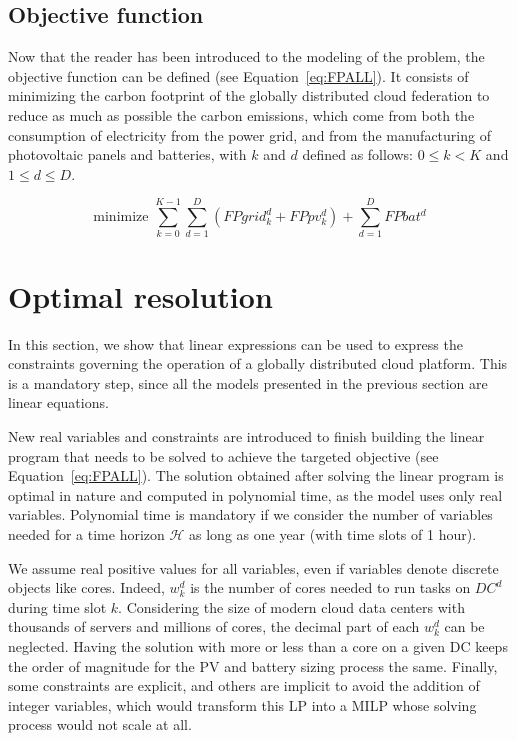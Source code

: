\subsection{Objective function}
\label{sec:objectivefunction_ccgrid}

Now that the reader has been introduced to the modeling of the problem, the objective function can be defined (see Equation~\eqref{eq:FPALL}). It consists of minimizing the carbon footprint of the globally distributed cloud federation to reduce as much as possible the carbon emissions, which come from both the consumption of electricity from the power grid, and from the manufacturing of photovoltaic panels and batteries, with $k$ and $d$ defined as follows: $0\leq k< K$ and $1\leq d\leq D$.

\begin{equation} \label{eq:FPALL}
\text{minimize }\sum_{k=0}^{K-1} \sum_{d=1}^D ( FPgrid^d_k +  FPpv^d_k) + \sum_{d=1}^D FPbat^d
\end{equation}


\section{Optimal resolution}
\label{sec:optimalresolution_ccgrid}


In this section, we show that linear expressions can be used to express the constraints governing the operation of a globally distributed cloud platform. This is a mandatory step, since all the models presented in the previous section are linear equations. 

New real variables and constraints are introduced to finish building the linear program that needs to be solved to achieve the targeted objective (see Equation~\eqref{eq:FPALL}). The solution obtained after solving the linear program is optimal in nature and computed in polynomial time, as the model uses only real variables. Polynomial time is mandatory if we consider the number of variables needed for a time horizon $\mathcal{H}$ as long as one year (with time slots of 1 hour). 

We assume real positive values for all variables, even if variables denote discrete objects like cores. Indeed, $w_k^d$ is the number of cores needed to run tasks on $DC^d$ during time slot $k$. Considering the size of modern cloud data centers with thousands of servers and millions of cores, the decimal part of each $w_k^d$ can be neglected. Having the solution with more or less than a core on a given DC keeps the order of magnitude for the PV and battery sizing process the same. Finally, some constraints are explicit, and others are implicit to avoid the addition of integer variables, which would transform this LP into a MILP whose solving process would not scale at all.

